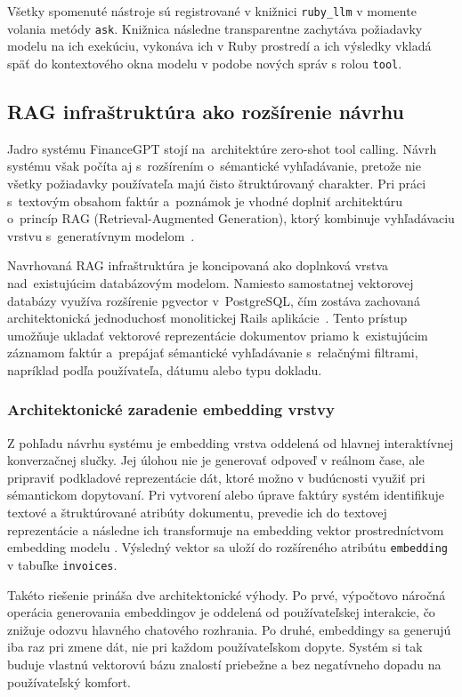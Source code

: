 Všetky spomenuté nástroje sú registrované v knižnici \texttt{ruby\_llm} v momente
volania metódy \texttt{ask}. Knižnica následne transparentne zachytáva požiadavky
modelu na ich exekúciu, vykonáva ich v Ruby prostredí a ich výsledky vkladá späť
do kontextového okna modelu v podobe nových správ s rolou \texttt{tool}.

\subsection{RAG infraštruktúra ako rozšírenie návrhu}

Jadro systému FinanceGPT stojí na~architektúre zero-shot tool calling. Návrh systému
však počíta aj s~rozšírením o~sémantické vyhľadávanie, pretože nie všetky
požiadavky používateľa majú čisto štruktúrovaný charakter. Pri práci s~textovým obsahom
faktúr a~poznámok je vhodné doplniť architektúru o~princíp RAG (Retrieval-Augmented
Generation), ktorý kombinuje vyhľadávaciu vrstvu s~generatívnym modelom~\cite{zhao2023,
gao2024ragsurvey}.

Navrhovaná RAG infraštruktúra je koncipovaná ako doplnková vrstva nad~existujúcim
databázovým modelom. Namiesto samostatnej vektorovej databázy využíva rozšírenie pgvector
v~PostgreSQL, čím zostáva zachovaná architektonická jednoduchosť monolitickej
Rails aplikácie~\cite{rothman2024transformers}. Tento prístup umožňuje ukladať vektorové
reprezentácie dokumentov priamo k~existujúcim záznamom faktúr a~prepájať sémantické
vyhľadávanie s~relačnými filtrami, napríklad podľa používateľa, dátumu alebo typu
dokladu.

\subsubsection{Architektonické zaradenie embedding vrstvy}

Z pohľadu návrhu systému je embedding vrstva oddelená od hlavnej interaktívnej
konverzačnej slučky. Jej úlohou nie je generovať odpoveď v reálnom čase, ale
pripraviť podkladové reprezentácie dát, ktoré možno v budúcnosti využiť pri sémantickom
dopytovaní. Pri vytvorení alebo úprave faktúry systém identifikuje textové a
štruktúrované atribúty dokumentu, prevedie ich do textovej reprezentácie a následne
ich transformuje na embedding vektor prostredníctvom embedding modelu \cite{atkinson2025}.
Výsledný vektor sa uloží do rozšíreného atribútu \texttt{embedding} v tabuľke \texttt{invoices}.

Takéto riešenie prináša dve architektonické výhody. Po prvé, výpočtovo náročná
operácia generovania embeddingov je oddelená od používateľskej interakcie, čo znižuje
odozvu hlavného chatového rozhrania. Po druhé, embeddingy sa generujú iba raz pri
zmene dát, nie pri každom používateľskom dopyte. Systém si tak buduje vlastnú vektorovú
bázu znalostí priebežne a bez negatívneho dopadu na používateľský komfort.

